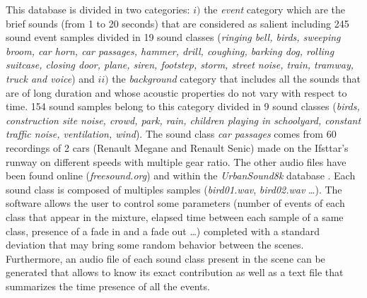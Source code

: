 \documentclass[twocolumn,a4paper,10pt]{article}
\begin{document}
This database is divided in two categories: $i)$ the \textit{event} category which are the brief sounds (from 1 to 20 seconds) that are considered as salient including 245 sound event samples divided in 19 sound classes (\textit{ringing bell, birds, sweeping broom, car horn, car passages, hammer, drill, coughing, barking dog, rolling suitcase, closing door, plane, siren, footstep, storm, street noise, train, tramway, truck and voice}) and $ii)$ the \textit{background} category that includes all the sounds that are of long duration and whose acoustic properties do not vary with respect to time. 154 sound samples belong to this category divided in 9 sound classes (\textit{birds, construction site noise, crowd, park, rain, children playing in schoolyard, constant traffic noise, ventilation, wind}). The sound class \textit{car passages} comes from 60 recordings of 2 cars (Renault Megane and Renault Senic) made on the Ifsttar's runway on different speeds with multiple gear ratio. The other audio files have been found online (\textit{freesound.org}) and within the \textit{UrbanSound8k} database \cite{salamon_dataset_nodate}. Each sound class is composed of multiples samples (\textit{bird01.wav}, \textit{bird02.wav} \dots).
The software allows the user to control some parameters (number of events of each class that appear in the mixture, elapsed time between each sample of a same class, presence of a fade in and a fade out \dots) completed with a standard deviation that may bring some random behavior between the scenes. Furthermore, an audio file of each sound class present in the scene can be generated that allows to know its exact contribution as well as a text file that summarizes the time presence of all the events.\\
\end{document}
